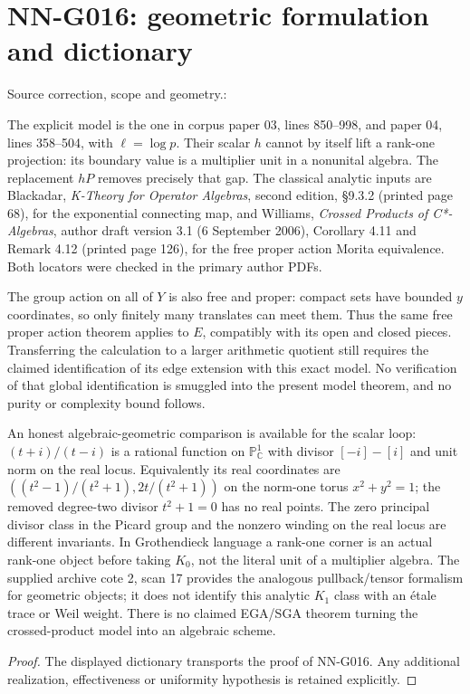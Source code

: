\section{NN-G016: geometric formulation and dictionary}
\begin{geometricstatement}[NN-G016]
Source correction, scope and geometry.:

The explicit model is the one in corpus paper 03, lines 850--998,
and paper 04, lines 358--504, with $\ell=\log p$. Their scalar
$h$ cannot by itself lift a rank-one projection: its boundary
value is a multiplier unit in a nonunital algebra. The replacement
$hP$ removes precisely that gap. The classical analytic inputs
are Blackadar, \emph{K-Theory for Operator Algebras}, second edition,
\S9.3.2 (printed page 68), for the exponential connecting map,
and Williams, \emph{Crossed Products of C*-Algebras}, author draft
version 3.1 (6 September 2006), Corollary 4.11 and Remark 4.12
(printed page 126), for the free proper action Morita equivalence.
Both locators were checked in the primary author PDFs.

The group action on all of $Y$ is also free and proper: compact
sets have bounded $y$ coordinates, so only finitely many translates
can meet them. Thus the same free proper action theorem applies
to $E$, compatibly with its open and closed pieces. Transferring
the calculation to a larger arithmetic quotient still requires the
claimed identification of its edge extension with this exact model.
No verification of that global identification is smuggled into
the present model theorem, and no purity or complexity bound follows.

An honest algebraic-geometric comparison is available for the
scalar loop: $(t+i)/(t-i)$ is a rational function on
$\mathbb P^1_{\mathbb C}$ with divisor $[-i]-[i]$ and unit norm
on the real locus. Equivalently its real coordinates are
$((t^2-1)/(t^2+1),2t/(t^2+1))$ on the norm-one torus
$x^2+y^2=1$; the removed degree-two divisor $t^2+1=0$ has no
real points. The zero principal divisor class in the Picard
group and the nonzero winding on the real locus are different
invariants. In Grothendieck language a rank-one corner is an
actual rank-one object before taking $K_0$, not the literal unit
of a multiplier algebra. The supplied archive cote 2, scan 17
provides the analogous pullback/tensor formalism for geometric
objects; it does not identify this analytic $K_1$ class with an
\'{e}tale trace or Weil weight. There is no claimed EGA/SGA theorem
turning the crossed-product model into an algebraic scheme.


\end{geometricstatement}
\begin{proof} The displayed dictionary transports the proof of NN-G016. Any additional realization, effectiveness or uniformity hypothesis is retained explicitly.\end{proof}


